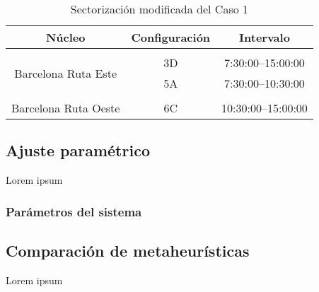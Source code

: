 \begin{table}[h]
	\centering
	\caption{Sectorización modificada del Caso 1}
	\begin{tabular}{ccc}
		\hline
		\textbf{Núcleo}                                           & \textbf{Configuración} & \textbf{Intervalo}   \\ \hline
		\multicolumn{1}{l}{}                                      & \multicolumn{1}{l}{}   & \multicolumn{1}{l}{} \\
		\multicolumn{1}{c|}{\multirow{2}{*}{Barcelona Ruta Este}} & 3D                     & 7:30:00--15:00:00    \\
		\multicolumn{1}{c|}{}                                     & 5A                     & 7:30:00--10:30:00    \\
		\multicolumn{1}{l}{}                                      & \multicolumn{1}{l}{}   & \multicolumn{1}{l}{} \\
		Barcelona Ruta Oeste                                      & 6C                     & 10:30:00--15:00:00   \\ \hline
	\end{tabular}
	\label{table:5:caso1-modif}
\end{table}

\subsection{Ajuste paramétrico}
Lorem ipsum
\subsubsection{Parámetros del sistema} \label{capitulo:5:parametros-sistema}

\subsection{Comparación de metaheurísticas}
Lorem ipsum
